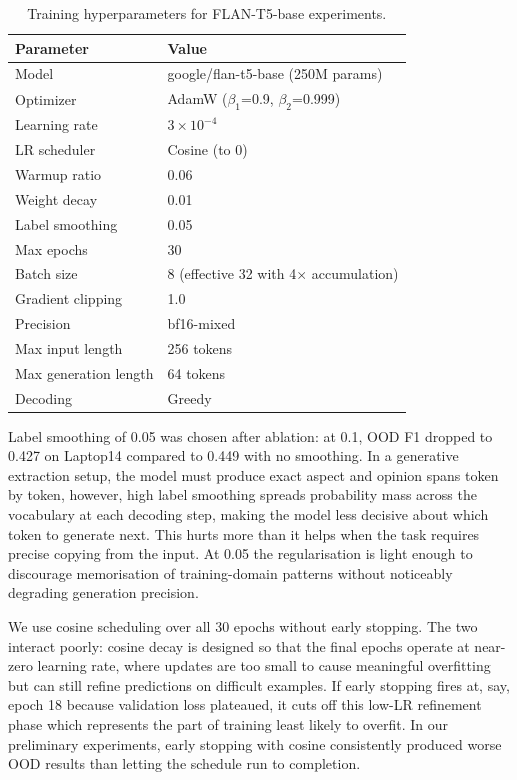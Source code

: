 \documentclass[12pt,a4paper]{report}
\begin{document}
\begin{table}[H]
\centering
\caption{Training hyperparameters for FLAN-T5-base experiments.}
\label{tab:hyperparams}
\small
\begin{tabular}{@{}ll@{}}
\toprule
\textbf{Parameter} & \textbf{Value} \\
\midrule
Model & google/flan-t5-base (250M params) \\
Optimizer & AdamW ($\beta_1$=0.9, $\beta_2$=0.999) \\
Learning rate & $3 \times 10^{-4}$ \\
LR scheduler & Cosine (to 0) \\
Warmup ratio & 0.06 \\
Weight decay & 0.01 \\
Label smoothing & 0.05 \\
Max epochs & 30 \\
Batch size & 8 (effective 32 with 4$\times$ accumulation) \\
Gradient clipping & 1.0 \\
Precision & bf16-mixed \\
Max input length & 256 tokens \\
Max generation length & 64 tokens \\
Decoding & Greedy \\
\bottomrule
\end{tabular}
\end{table}

Label smoothing of 0.05 was chosen after ablation: at 0.1, OOD F1 dropped to 0.427 on Laptop14 compared to 0.449 with no smoothing. In a generative extraction setup, the model must produce exact aspect and opinion spans token by token, however, high label smoothing spreads probability mass across the vocabulary at each decoding step, making the model less decisive about which token to generate next. This hurts more than it helps when the task requires precise copying from the input. At 0.05 the regularisation is light enough to discourage memorisation of training-domain patterns without noticeably degrading generation precision.

We use cosine scheduling over all 30 epochs without early stopping. The two interact poorly: cosine decay is designed so that the final epochs operate at near-zero learning rate, where updates are too small to cause meaningful overfitting but can still refine predictions on difficult examples. If early stopping fires at, say, epoch 18 because validation loss plateaued, it cuts off this low-LR refinement phase which represents the part of training least likely to overfit. In our preliminary experiments, early stopping with cosine consistently produced worse OOD results than letting the schedule run to completion.
\end{document}
